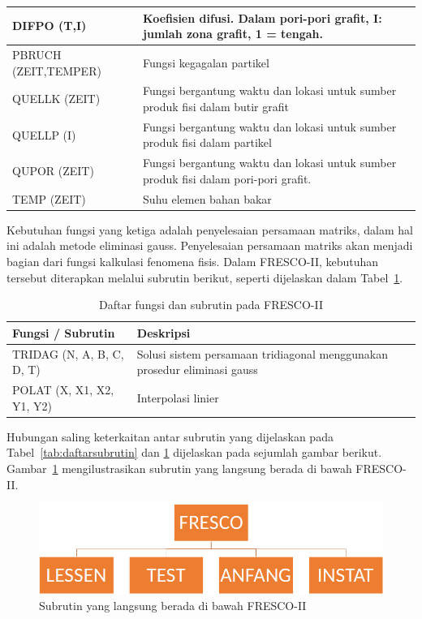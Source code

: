 \documentclass[a4paper,11pt]{report}
\renewcommand{\figurename}{Gambar}
\renewcommand{\tablename}{Tabel}
\begin{document}
\begin{table}[h!]
\begin{center}
\begin{tabular}{p{3cm}p{10cm}}
    DIFPO (T,I) & Koefisien difusi. Dalam pori-pori grafit, I: jumlah zona grafit, 1 = tengah.\\ \hline
    PBRUCH (ZEIT,TEMPER) & Fungsi kegagalan partikel\\ \hline
    QUELLK (ZEIT) & Fungsi bergantung waktu dan lokasi untuk sumber produk fisi dalam butir grafit\\ \hline
    QUELLP (I) & Fungsi bergantung waktu dan lokasi untuk sumber produk fisi dalam partikel\\ \hline
    QUPOR (ZEIT) & Fungsi bergantung waktu dan lokasi untuk sumber produk fisi dalam pori-pori grafit.\\ \hline
    TEMP (ZEIT) & Suhu elemen bahan bakar \\ 
      \bottomrule
    \end{tabular}
  \end{center}
\end{table}

Kebutuhan fungsi yang ketiga adalah penyelesaian persamaan matriks, dalam hal ini adalah metode eliminasi gauss. Penyelesaian persamaan matriks akan menjadi bagian dari fungsi kalkulasi fenomena fisis. Dalam FRESCO-II, kebutuhan tersebut diterapkan melalui subrutin berikut, seperti dijelaskan dalam \tablename~\ref{tab:daftarsubrutin2}.

\begin{table}[h!]
  \caption{Daftar fungsi dan subrutin pada FRESCO-II}
  \label{tab:daftarsubrutin2}
  \begin{center}
    \begin{tabular}{p{3cm}p{10cm}} \toprule
    Fungsi / Subrutin & Deskripsi\\ \midrule
    TRIDAG (N, A, B, C, D, T) & Solusi sistem persamaan tridiagonal menggunakan prosedur eliminasi gauss\\ \hline
    POLAT (X, X1, X2, Y1, Y2) & Interpolasi linier \\
      \bottomrule
    \end{tabular}
  \end{center}
\end{table}

Hubungan saling keterkaitan antar subrutin yang dijelaskan pada \tablename~\ref{tab:daftarsubrutin} dan \ref{tab:daftarsubrutin2} dijelaskan pada sejumlah gambar berikut. \figurename~\ref{fig:interaction0} mengilustrasikan subrutin yang langsung berada di bawah FRESCO-II.

\begin{figure}[h!]
  \begin{center}
    \includegraphics[scale=.35]{pics/intertaction0.png}
    \caption{Subrutin yang langsung berada di bawah FRESCO-II}
    \label{fig:interaction0}
  \end{center}
\end{figure}
\end{document}
